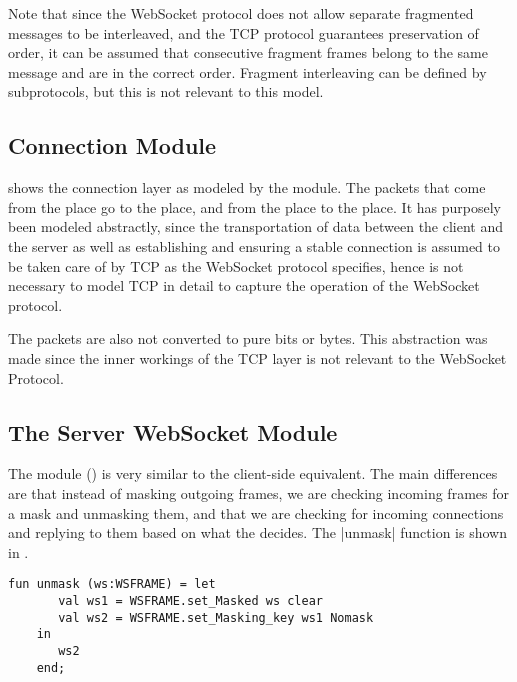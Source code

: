 			Note that since the WebSocket protocol does not allow separate fragmented
			messages to be interleaved, and the TCP protocol guarantees preservation of
			order, it can be assumed that consecutive fragment frames belong to the same
			message and are in the correct order.
			Fragment interleaving can be defined by subprotocols, but this is not
			relevant to this model.
			
\subsection{Connection Module}

	
	 shows the connection layer as modeled by the
	 module. The packets that come from the  place go to the  place, and from the
	 place to the  place. It has
	purposely been modeled abstractly, since the transportation of data between the
	client and the server as well as establishing and ensuring a stable
	connection is assumed to be taken care of by TCP as the WebSocket protocol
	specifies, hence is not necessary to model TCP in detail to capture the
	operation of the WebSocket protocol.
	
	The packets are also not converted to pure bits or bytes. This abstraction was
	made since the inner workings of the TCP layer is not relevant to the WebSocket
	Protocol.

\subsection{The Server WebSocket Module}
	
	
	The  module () is very similar
	to the client-side equivalent.
	The main differences are that instead of masking outgoing frames, we are checking
	incoming frames for a mask and unmasking them, and that we are checking for
	incoming connections and replying to them based on what the  decides. The |unmask| function is shown in .
	 
	\begin{lstlisting}[label=lst:unmask,caption=unmask,gobble=1,float=h]
	fun unmask (ws:WSFRAME) = let
	   val ws1 = WSFRAME.set_Masked ws clear
	   val ws2 = WSFRAME.set_Masking_key ws1 Nomask
	in 
	   ws2
	end;
	\end{lstlisting}
		

